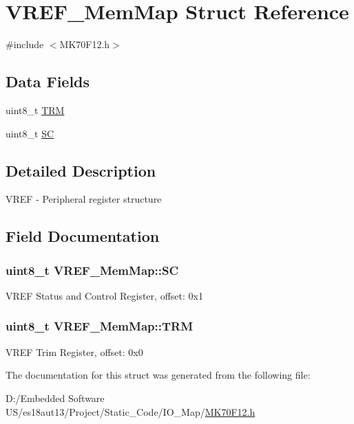 \hypertarget{struct_v_r_e_f___mem_map}{}\section{V\+R\+E\+F\+\_\+\+Mem\+Map Struct Reference}
\label{struct_v_r_e_f___mem_map}


{\ttfamily \#include $<$M\+K70\+F12.\+h$>$}

\subsection*{Data Fields}
\begin{DoxyCompactItemize}
\item 
uint8\+\_\+t \hyperlink{struct_v_r_e_f___mem_map_a987ecd280eb0b25ff58841b304de2e1f}{T\+R\+M}
\item 
uint8\+\_\+t \hyperlink{struct_v_r_e_f___mem_map_a5d8e7e9026a69a14ff0d0b3caee5cf24}{S\+C}
\end{DoxyCompactItemize}


\subsection{Detailed Description}
V\+R\+E\+F -\/ Peripheral register structure 

\subsection{Field Documentation}
\hypertarget{struct_v_r_e_f___mem_map_a5d8e7e9026a69a14ff0d0b3caee5cf24}{}
\subsubsection[{S\+C}]{\setlength{\rightskip}{0pt plus 5cm}uint8\+\_\+t V\+R\+E\+F\+\_\+\+Mem\+Map\+::\+S\+C}\label{struct_v_r_e_f___mem_map_a5d8e7e9026a69a14ff0d0b3caee5cf24}
V\+R\+E\+F Status and Control Register, offset\+: 0x1 \hypertarget{struct_v_r_e_f___mem_map_a987ecd280eb0b25ff58841b304de2e1f}{}
\subsubsection[{T\+R\+M}]{\setlength{\rightskip}{0pt plus 5cm}uint8\+\_\+t V\+R\+E\+F\+\_\+\+Mem\+Map\+::\+T\+R\+M}\label{struct_v_r_e_f___mem_map_a987ecd280eb0b25ff58841b304de2e1f}
V\+R\+E\+F Trim Register, offset\+: 0x0 

The documentation for this struct was generated from the following file\+:\begin{DoxyCompactItemize}
\item 
D\+:/\+Embedded Software U\+S/es18aut13/\+Project/\+Static\+\_\+\+Code/\+I\+O\+\_\+\+Map/\hyperlink{_m_k70_f12_8h}{M\+K70\+F12.\+h}\end{DoxyCompactItemize}
